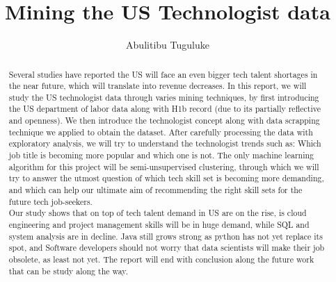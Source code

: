 \documentclass[sigconf]{acmart}
\begin{document}
	\title{Mining the US Technologist data}
	
	
	\author{Abulitibu Tuguluke}
	

		\begin{abstract}
Several studies have reported the US will face an even bigger tech talent shortages in the near future, which will translate into revenue decreases.  In this report, we will study the US technologist data through varies  mining techniques, by first introducing the US department of labor data along with H1b record (due to its partially reflective and openness). We then introduce the technologist concept along with data scrapping technique we applied to obtain the dataset. After carefully processing the data with exploratory analysis, we will try to understand the technologist trends such as: Which job title is becoming more popular and which one is not. The only machine learning algorithm for this project will be semi-unsupervised clustering, through which we will try to answer the utmost question of which tech skill set is becoming more demanding, and which can help our ultimate aim of recommending the right skill sets for the future tech job-seekers. \\
Our study shows that on top of tech talent demand in US are on the rise, is cloud engineering and project management skills will be in huge demand, while SQL and system analysis are in decline. Java still grows strong as python has not yet replace its spot, and Software developers should not worry that data scientists will make their job obsolete, as least not yet.  The report will end with conclusion along  the future work that can be study along the way.
	\end{abstract}
	\maketitle

	
	
	
	
	\nocite{*}
	 
	
\end{document}
